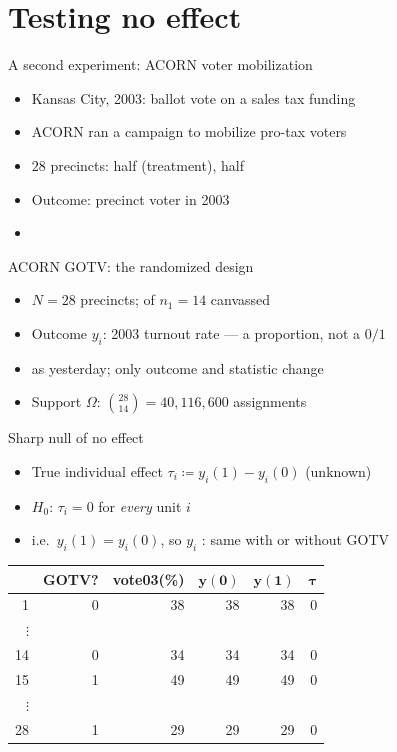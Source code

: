 \documentclass[table, xcolor = {dvipsnames}, 9pt]{beamer}
\theoremstyle{plain}
\newcommand{\mh}[1]{{\color{magenta}{#1}}}
\begin{document}
\section{Testing no effect}
\begin{frame}[t]{A second experiment: ACORN voter mobilization}
\vfill
\begin{itemize} \vfill
\item Kansas City, 2003: ballot vote on a sales tax funding \mh{public transit} \vfill
\item ACORN ran a \mh{door-to-door} campaign to mobilize pro-tax voters \vfill
\item $28$ precincts: half \mh{canvassed} (treatment), half \mh{control} \vfill
\item Outcome: precinct voter \mh{turnout} in 2003 \vfill
\item[] \citet{arceneaux2005} \vfill
\end{itemize} \vfill
\end{frame}
\begin{frame}[t]{ACORN GOTV: the randomized design}
\vfill
\begin{itemize} \vfill
\item $N = 28$ precincts; \mh{complete random assignment} of $n_1 = 14$ canvassed \vfill
\item Outcome $y_i$: 2003 turnout rate --- a proportion, not a $0/1$ \vfill
\item \mh{Same design-based logic} as yesterday; only outcome and statistic change \vfill
\item[] Support $\Omega$: $\binom{28}{14} = 40{,}116{,}600$ assignments \vfill
\end{itemize} \vfill
\end{frame}
\begin{frame}[t]{Sharp null of no effect}
\vfill
\begin{itemize} \vfill
\item True individual effect $\tau_i \coloneqq y_i(1) - y_i(0)$ (unknown) \vfill
\item \mh{No-effect null} $H_0$: $\tau_i = 0$ for \emph{every} unit $i$ \vfill
\item[] i.e.\ $y_i(1) = y_i(0)$, so $y_i$ \mh{fixed}: same with or without GOTV \vfill
\end{itemize} \vfill
\begin{table}
\centering \small
  \begin{tabular}{r|rr|rrr}
  \hline
 & GOTV? & vote03(\%)& $\bm{y}(\bm{0})$ & $\bm{y}(\bm{1})$ & $\bm{\tau}$\\
  \hline
1 & 0 & 38 & 38 & 38 & 0 \\
$\vdots$& & & & & \\
14 & 0 & 34 & 34 & 34 & 0 \\
15 & 1 & 49 & 49 & 49 & 0 \\
$\vdots$& & & & & \\
28 & 1 & 29 & 29 & 29 & 0 \\
   \hline
\end{tabular}
\end{table}
\vfill
\end{frame}
\end{document}

